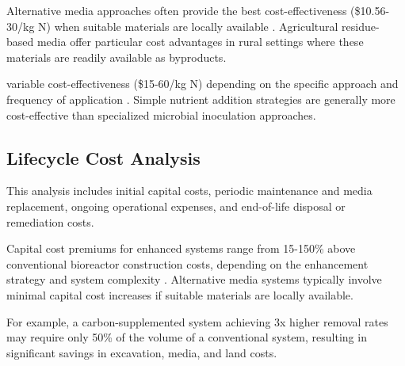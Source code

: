 \documentclass[12pt,a4paper]{article}
\begin{document}
Alternative media approaches often provide the best cost-effectiveness (\$10.56-30/kg N) when suitable materials are locally available \citep{RN196, RN289}.  Agricultural residue-based media offer particular cost advantages in rural settings where these materials are readily available as byproducts.

 variable cost-effectiveness (\$15-60/kg N) depending on the specific approach and frequency of application \citep{RN289, RN350, RN196}. Simple nutrient addition strategies are generally more cost-effective than specialized microbial inoculation approaches.

\subsection{Lifecycle Cost Analysis}

 This analysis includes initial capital costs, periodic maintenance and media replacement, ongoing operational expenses, and end-of-life disposal or remediation costs.

Capital cost premiums for enhanced systems range from 15-150\% above conventional bioreactor construction costs, depending on the enhancement strategy and system complexity \citep{RN289}.  Alternative media systems typically involve minimal capital cost increases if suitable materials are locally available.

 For example, a carbon-supplemented system achieving 3x higher removal rates may require only 50\% of the volume of a conventional system, resulting in significant savings in excavation, media, and land costs.
\end{document}
